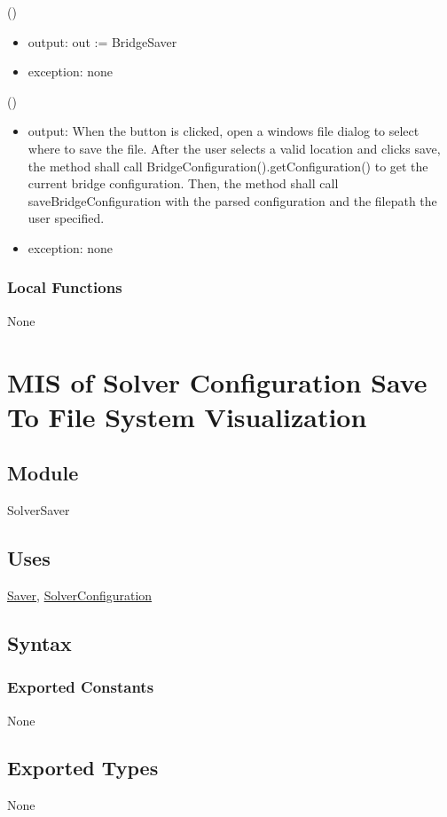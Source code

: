 \documentclass[12pt, titlepage]{article}
\begin{document}
()
\begin{itemize}
\item output: out :=  BridgeSaver
\item exception: none
\end{itemize}

()
\begin{itemize} 
\item output: When the button is clicked, open a windows file dialog to select where to save the file. After the user selects a valid location and clicks save, the method shall call BridgeConfiguration().getConfiguration() to get the current bridge configuration. Then, the method shall call saveBridgeConfiguration with the parsed configuration and the filepath the user specified.
\item exception: none
\end{itemize}

\subsubsection{Local Functions}
None
\newpage
\section{MIS of Solver Configuration Save To File System Visualization} \label{SolverSaver}

\subsection{Module}

SolverSaver

\subsection{Uses}
\hyperref[Saver]{Saver}, \hyperref[SolverConfiguration]{SolverConfiguration}

\subsection{Syntax}

\subsubsection{Exported Constants}
None
\subsection{Exported Types}
None
\end{document}
